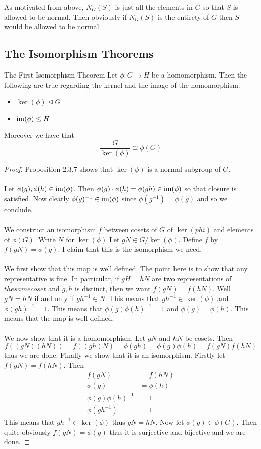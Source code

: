 \documentclass[a4paper]{article}
\begin{document}
As motivated from above, $N_G(S)$ is just all the elements in $G$ so that $S$ is allowed to be normal. Then obviously if $N_G(S)$ is the entirety of $G$ then $S$ would be allowed to be normal. 

\subsection{The Isomorphism Theorems}
\begin{thm}{The First Isomorphism Theorem}{} Let $\phi:G\to H$ be a homomorphism. Then the following are true regarding the kernel and the image of the homomorphism. 
\begin{itemize}
\item $\ker(\phi)\trianglelefteq G$
\item $\operatorname{im}(\phi)\leq H$
\end{itemize} 
Moreover we have that $$\frac{G}{\ker(\phi)}\cong\phi(G)$$ \tcbline
\begin{proof}
Proposition 2.3.7 shows that $\ker(\phi)$ is a normal subgroup of $G$. \\~\\

Let $\phi(g),\phi(h)\in\operatorname{im}(\phi)$. Then $\phi(g)\cdot\phi(h)=\phi(gh)\in\operatorname{im}(\phi)$ so that closure is satisfied. Now clearly $\phi(g)^{-1}\in\operatorname{im}(\phi)$ since $\phi(g^{-1})=\phi(g)$ and so we conclude. \\~\\

We construct an isomorphism $f$ between cosets of $G$ of $\ker(phi)$ and elements of $\phi(G)$. Write $N$ for $\ker(\phi)$ Let $gN\in G/\ker(\phi)$. Define $f$ by $f(gN)=\phi(g)$. I claim that this is the isomorphism we need. \\~\\
We first show that this map is well defined. The point here is to show that any representative is fine. In particular, if $gH=hN$ are two representations of $the same coset$ and $g,h$ is distinct, then we want $f(gN)=f(hN)$. Well $gN=hN$ if and only if $gh^{-1}\in N$. This means that $gh^{-1}\in\ker(\phi)$ and $\phi(gh)^{-1}=1$. This means that $\phi(g)\phi(h)^{-1}=1$ and $\phi(g)=\phi(h)$. This means that the map is well defined. \\~\\
We now show that it is a homomorphism. Let $gN$ and $hN$ be cosets. Then $$f((gN)(hN))=f((gh)N)=\phi(gh)=\phi(g)\phi(h)=f(gN)f(hN)$$ thus we are done. Finally we show that it is an isomorphism. Firstly let $f(gN)=f(hN)$. Then
\begin{align*}
f(gN)&=f(hN)\\
\phi(g)&=\phi(h)\\
\phi(g)\phi(h)^{-1}&=1\\
\phi(gh^{-1})&=1
\end{align*}
This means that $gh^{-1}\in\ker(\phi)$ thus $gN=hN$. Now let $\phi(g)\in\phi(G)$. Then quite obviously $f(gN)=\phi(g)$ thus it is surjective and bijective and we are done. 
\end{proof}
\end{thm}
\end{document}
